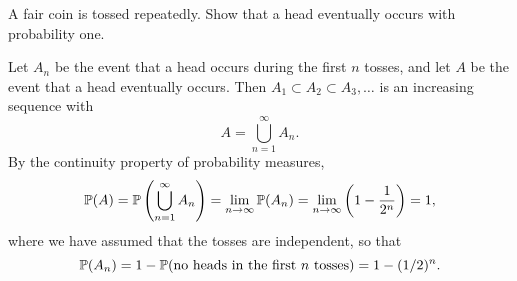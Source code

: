 \begin{example}
A fair coin is tossed repeatedly. Show that a head eventually occurs with probability one.
\begin{solution}
Let $A_n$ be the event that a head occurs during the first $n$ tosses, and let $A$ be the event that a head eventually occurs. Then $A_1\subset A_2\subset A_3,\ldots$ is an increasing sequence with 
\[
A=\bigcup_{n=1}^{\infty} A_n.
\]
By the continuity property of probability measures,
\[
\mathbb{P}(A) 
	= \mathbb{P}\left(\bigcup_{n=1}^{\infty}A_n\right)
	= \lim_{n\to\infty} \mathbb{P}(A_n)
	= \lim_{n\to\infty} \left(1 - \frac{1}{2^n}\right) = 1,
\]
where we have assumed that the tosses are independent, so that
\[
\mathbb{P}(A_n) = 1 - \mathbb{P}(\text{no heads in the first $n$ tosses}) = 1 - (1/2)^n.
\]
\end{solution}
\end{example}

